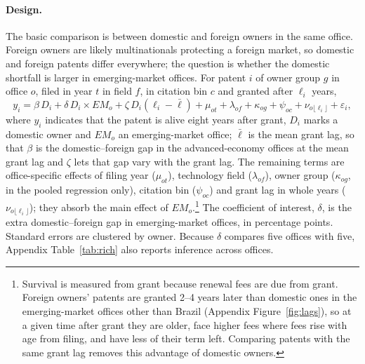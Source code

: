 \paragraph{Design.} The basic comparison is between domestic and foreign owners in the same office. Foreign owners are likely multinationals protecting a foreign market, so domestic
and foreign patents differ everywhere; the question is whether the domestic shortfall is larger in emerging-market
offices. For patent $i$ of owner group $g$ in office $o$, filed in year $t$ in field $f$, in citation bin $c$ and granted
after $\ell_i$ years,
\begin{equation}\label{eq:did}
  y_{i} = \beta\, D_i + \delta\, D_i \times EM_o + \zeta\, D_i (\ell_i - \bar\ell) + \mu_{ot} + \lambda_{of}
  + \kappa_{og} + \psi_{oc} + \nu_{o\lfloor\ell_i\rfloor} + \varepsilon_i ,
\end{equation}
where $y_i$ indicates that the patent is alive eight years after grant, $D_i$ marks a domestic owner and $EM_o$ an
emerging-market office; $\bar\ell$ is the mean grant lag, so that $\beta$ is the domestic--foreign gap in the
advanced-economy offices at the mean grant lag and $\zeta$ lets that gap vary with the grant lag. The remaining terms
are office-specific effects of filing year ($\mu_{ot}$), technology field ($\lambda_{of}$), owner group
($\kappa_{og}$, in the pooled regression only), citation bin ($\psi_{oc}$) and grant lag in whole years
($\nu_{o\lfloor\ell_i\rfloor}$); they absorb the main effect of $EM_o$.\footnote{Survival is measured from grant because renewal fees are due from grant. Foreign owners' patents are granted 2--4 years later than domestic ones in the emerging-market offices other than Brazil (Appendix
Figure~\ref{fig:lags}), so at a given time after grant they are older, face higher fees where fees rise with age from filing, and
have less of their term left. Comparing patents with the same grant lag removes this advantage of domestic owners.}
The coefficient of interest, $\delta$, is the extra domestic--foreign gap in emerging-market offices, in percentage
points. Standard errors are clustered by owner. Because $\delta$ compares five offices with five, Appendix Table~\ref{tab:rich} also
reports inference across offices.
